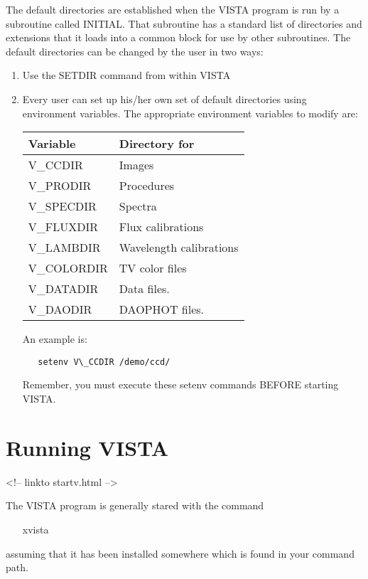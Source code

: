 The default directories are established when the VISTA program is run by a
subroutine called INITIAL.  That subroutine has a standard list of
directories and extensions that it loads into a common block for use by
other subroutines. The default directories can be changed by the user in
two ways:

\begin{enumerate}
   \item Use the SETDIR command from within VISTA

   \item Every user can set up his/her own set of default directories using
         environment variables. The appropriate environment variables to
         modify are:\newline
\begin{tabular}{ll}
   Variable    & Directory for \\ \hline
   V\_CCDIR    & Images \\
   V\_PRODIR   & Procedures \\
   V\_SPECDIR  & Spectra \\
   V\_FLUXDIR  & Flux calibrations \\
   V\_LAMBDIR  & Wavelength calibrations \\
   V\_COLORDIR & TV color files \\
   V\_DATADIR  & Data files. \\
   V\_DAODIR   & DAOPHOT files. \\ \hline
\end{tabular}

An example is:
\begin{verbatim}
   setenv V\_CCDIR /demo/ccd/
\end{verbatim}
Remember, you must execute these setenv commands BEFORE starting VISTA.

\end{enumerate}

\section{Running VISTA}
\begin{rawhtml}
<!-- linkto startv.html -->
\end{rawhtml}


The VISTA program is generally stared with the command
\begin{itemize}
   \item[xvista\hfill]{}
\end{itemize}
assuming that it has been installed somewhere which is found in your
command path.


